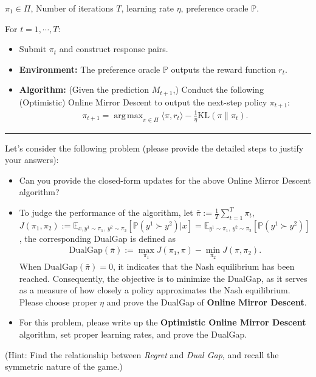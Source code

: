 \documentclass[11pt,oneside,a4paper]{article}
\DeclareMathOperator*{\argmax}{arg\,max}
\begin{document}
 $\pi_1 \in \Pi$, Number of iterations $T$, learning rate $\eta$, preference oracle $\mathbb{P}$.

\noindent For $t=1,\cdots, T:$ 
\begin{itemize}
\item {}  Submit $\pi_t$ and construct response pairs.
\item {\bf Environment:} The preference oracle $\mathbb{P}$ outputs the reward function $r_t$.
\item {\bf Algorithm:} (Given the prediction $M_{t+1}$,) Conduct the following (Optimistic) Online Mirror Descent to output the next-step policy $\pi_{t+1}$:
\begin{align*}
    \pi_{t+1} = \argmax_{\pi \in \Pi} \langle \pi, r_t \rangle - \frac{1}{\eta} \text{KL}(\pi\|\pi_t). 
\end{align*}
\end{itemize}
\vspace{0.02in}
\hrule
\vspace{0.1in}

\noindent Let's consider the following problem (please provide the detailed steps to justify your answers):
\begin{itemize}
    \item Can you provide the closed-form updates for the above Online Mirror Descent algorithm?
    \item To judge the performance of the algorithm, let $\bar \pi := \frac{1}{T}\sum_{t=1}^T \pi_t$, $J(\pi_1,\pi_2):= \mathbb{E}_{x,y^1\sim \pi_1,~y^2\sim \pi_2}[\mathbb{P}(y^1\succ y^2) |x] =\mathbb{E}_{y^1\sim \pi_1,~y^2\sim \pi_2}[\mathbb{P}(y^1\succ y^2)] $, the corresponding DualGap is defined as
    \begin{align*}
        \text{DualGap}(\bar \pi):= \max_{\pi_1} J(\pi_1, \pi) - \min_{\pi_2}J(\pi,\pi_2).
    \end{align*}
    When $\text{DualGap}(\bar \pi)=0$, it indicates that the Nash equilibrium has been reached. Consequently, the objective is to minimize the DualGap, as it serves as a measure of how closely a policy approximates the Nash equilibrium. Please choose proper $\eta$ and prove the DualGap of \textbf{Online Mirror Descent}.
    \item For this problem, please write up the  \textbf{Optimistic Online Mirror Descent} algorithm, set proper learning rates, and prove the DualGap.
\end{itemize}
(Hint: Find the relationship between \textit{Regret} and \textit{Dual Gap}, and recall the symmetric nature of the game.)
\newpage
{}
\vspace{0.5cm}
\end{document}
